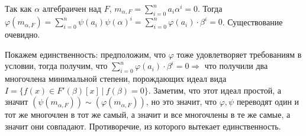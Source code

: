 \par \Proof Так как $\alpha$ алгебраичен над $F$, $m_{\alpha, F}=\sum_{i=0}^n a_i \alpha^i=0$. Тогда $\varphi(m_{\alpha, F})=\sum_{i=0}^n \psi(a_i) \psi(\alpha)^i=\sum_{i=0}^n \varphi(a_i) \cdot \beta^i = 0$. Существование очевидно.
\par Покажем единственность: предположим, что $\varphi$ тоже удовлетворяет требованиям в условии, тогда получим, что $\sum_{i=0}^n \varphi(a_i) \cdot \beta^i = 0 \Rightarrow$ что получили два многочлена минимальной степени, порождающих идеал вида $I=\{f(x) \in F'(\beta)[x] \: | \: f(\beta)=0\}$. Заметим, что этот идеал простой, а значит $(\psi(m_{\alpha, F})) \sim (\varphi(m_{\alpha, F}))$, но это значит, что $\varphi, \psi$ переводят один и тот же многочлен в тот же самый, а значит и все многочлены в те же самые, а значит они совпадают. Противоречие, из которого вытекает
единственность. \EndProof